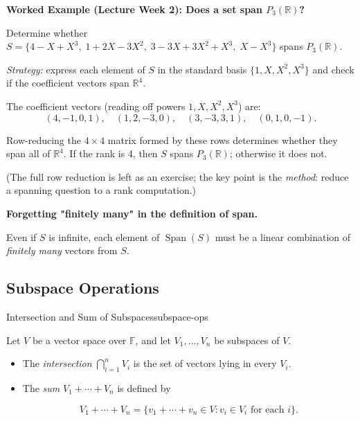 \begin{examplebox}
\textbf{Worked Example (Lecture Week 2): Does a set span $P_3(\mathbb{R})$?}

Determine whether $S=\{4-X+X^3,\; 1+2X-3X^2,\; 3-3X+3X^2+X^3,\; X-X^3\}$ spans $P_3(\mathbb{R})$.

\emph{Strategy:} express each element of $S$ in the standard basis $\{1,X,X^2,X^3\}$ and check if the coefficient vectors span $\mathbb{R}^4$.

The coefficient vectors (reading off powers $1, X, X^2, X^3$) are:
\[
(4,-1,0,1),\quad (1,2,-3,0),\quad (3,-3,3,1),\quad (0,1,0,-1).
\]

Row-reducing the $4\times 4$ matrix formed by these rows determines whether they span all of $\mathbb{R}^4$.  If the rank is $4$, then $S$ spans $P_3(\mathbb{R})$; otherwise it does not.

(The full row reduction is left as an exercise; the key point is the \emph{method}: reduce a spanning question to a rank computation.)
\end{examplebox}

\begin{commonmistake}

\textbf{Forgetting "finitely many" in the definition of span.}

Even if $S$ is infinite, each element of $\operatorname{Span}(S)$ must be a linear combination of \emph{finitely many} vectors from $S$.

\end{commonmistake}


\subsection{Subspace Operations}


\begin{definition}{Intersection and Sum of Subspaces}{subspace-ops}

Let $V$ be a vector space over $\mathbb{F}$, and let $V_1,\dots,V_n$ be subspaces of $V$.

\begin{itemize}[leftmargin=*]

\item The \emph{intersection} $\bigcap_{i=1}^n V_i$ is the set of vectors lying in every $V_i$.

\item The \emph{sum} $V_1+\cdots+V_n$ is defined by

\[
V_1+\cdots+V_n=\{v_1+\cdots+v_n \in V : v_i\in V_i \text{ for each }i\}.
\]

\end{itemize}

\end{definition}

